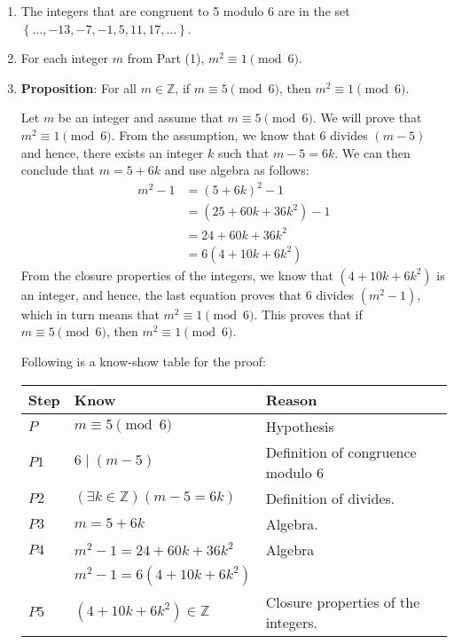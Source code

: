 \documentclass[11pt]{article}
\begin{document}
\begin{enumerate}
\item The integers that are congruent to 5 modulo 6 are in the set  
$\left\{ { \ldots ,  - 13,  - 7,  - 1, 5, 11, 17,  \ldots } \right\}$.

\item For each integer  $m$  from Part (1), $m^2  \equiv 1 \pmod 6$.  

\item \textbf{Proposition}:  For all  $m \in \mathbb{Z}$, if  $m \equiv 5 \pmod 6$, then  
$m^2  \equiv 1 \pmod 6$.

\begin{myproof}
Let $m$ be an integer and assume that $m \equiv 5 \pmod 6$.  We will prove that 
$m^2  \equiv 1 \pmod 6$.  From the assumption, we know that 6 divides $(m - 5)$ and hence, there exists an integer $k$ such that $m - 5 = 6k$.  We can then conclude that 
$m = 5 + 6k$ and use algebra as follows:
\begin{align*}
m^2 - 1 &= \left( 5 + 6k \right)^2 - 1 \\
        &= \left( 25 + 60k + 36k^2 \right) - 1 \\
        &= 24 + 60k + 36k^2 \\
        &= 6 \left( 4 + 10k + 6k^2 \right)
\end{align*}
From the closure properties of the integers, we know that 
$\left( {4 + 10k + 6k^2 } \right)$ is an integer, and hence, the last equation proves that 6 divides $\left( m^2 - 1 \right)$, which in turn means that $m^2  \equiv 1 \pmod 6$.  This proves that if $m \equiv 5 \pmod 6$, then  $m^2  \equiv 1 \pmod 6$.
\end{myproof}



\vskip12pt
\noindent
Following is a know-show table for the proof:

\begin{center}
\begin{tabular}[h]{|p{0.4in}|p{2in}|p{2.5in}|}
  \hline
  \textbf{Step}  &  \textbf{Know}  &  \textbf{Reason}     \\ \hline
  $P$     &  $m \equiv 5 \pmod 6$     &  Hypothesis \\ \hline
  $P1$    &  $6 \mid \left( m - 5 \right)$  &  Definition of congruence modulo 6           \\ \hline
  $P2$    &  $\left( {\exists k \in \mathbb{Z}} \right)\left( {m - 5 = 6k} \right)$     & Definition of divides.   \\  \hline
  $P3$    &     $m = 5 + 6k$     & Algebra.   \\  \hline  
  $P4$    &     $m^2  - 1 = 24 + 60k + 36k^2$  &  Algebra  \\
          &     $m^2 - 1 = 6\left( {4 + 10k + 6k^2 } \right)$ &  \\ \hline
  $P5$    &     $\left( {4 + 10k + 6k^2 } \right) \in \mathbb{Z}$    & Closure properties of the integers.   \\  \hline  


\end{tabular}
\end{center}
\end{enumerate}
\end{document}
